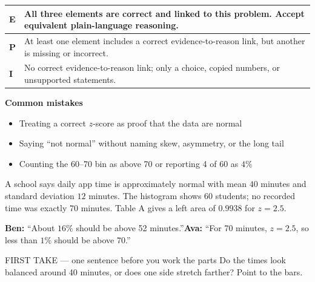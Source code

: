 \documentclass[11pt]{article}
\begin{document}
{\small\renewcommand{\arraystretch}{1.25}
\noindent\begin{tabular}{|p{0.5in}|p{5.9in}|}
\hline
\textbf{E} & All three elements are correct and linked to this problem. Accept equivalent plain-language reasoning. \\ \hline
\textbf{P} & At least one element includes a correct evidence-to-reason link, but another is missing or incorrect. \\ \hline
\textbf{I} & No correct evidence-to-reason link; only a choice, copied numbers, or unsupported statements. \\ \hline
\end{tabular}}

\textbf{Common mistakes}
\begin{itemize}[leftmargin=1.5em,itemsep=2pt,topsep=2pt]
  \item Treating a correct $z$-score as proof that the data are normal
  \item Saying ``not normal'' without naming skew, asymmetry, or the long tail
  \item Counting the 60--70 bin as above 70 or reporting 4 of 60 as $4\%$
\end{itemize}

\clearpage
{}

A school says daily app time is approximately normal with mean $40$ minutes and standard deviation $12$ minutes. The histogram shows 60 students; no recorded time was exactly 70 minutes. Table A gives a left area of $0.9938$ for $z=2.5$.\par\smallskip \textbf{Ben:} ``About $16\%$ should be above 52 minutes.''\quad \textbf{Ava:} ``For 70 minutes, $z=2.5$, so less than $1\%$ should be above 70.''\par
\begin{center}
\end{center}
\begin{firsttakebox}{FIRST TAKE --- one sentence before you work the parts}
Do the times look balanced around 40 minutes, or does one side stretch farther? Point to the bars.\par
{}
\end{firsttakebox}
\end{document}
